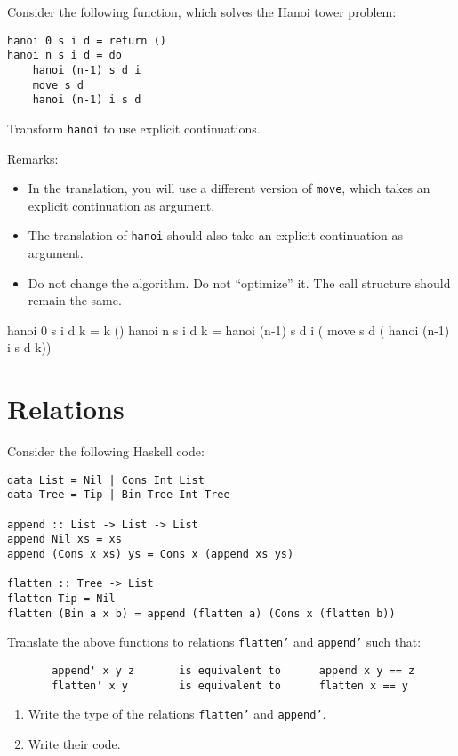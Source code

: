\documentclass{article}
\newcommand{\answer}[1]{}
\begin{document}
{Consider the following function, which solves the Hanoi tower problem:
\begin{verbatim}
hanoi 0 s i d = return ()
hanoi n s i d = do
    hanoi (n-1) s d i
    move s d 
    hanoi (n-1) i s d 
\end{verbatim}

Transform \texttt{hanoi} to use explicit continuations. 

Remarks: 
\begin{itemize}
\item In the translation, you will use a different version of
  \texttt{move}, which takes an explicit continuation as argument.
\item The translation of \texttt{hanoi} should also take an explicit
  continuation as argument.
\item Do not change the algorithm. Do not ``optimize'' it. The call
  structure should remain the same.
\end{itemize}

\answer{}{
hanoi 0 s i d k = k ()
hanoi n s i d k = 
    hanoi (n-1) s d i (
    move s d          (
    hanoi (n-1) i s d 
    k))
}

\section{Relations}

Consider the following Haskell code:

\begin{verbatim}
data List = Nil | Cons Int List
data Tree = Tip | Bin Tree Int Tree

append :: List -> List -> List
append Nil xs = xs
append (Cons x xs) ys = Cons x (append xs ys)

flatten :: Tree -> List
flatten Tip = Nil
flatten (Bin a x b) = append (flatten a) (Cons x (flatten b))
\end{verbatim}

Translate the above functions to relations \texttt{flatten'} and
\texttt{append'} such that:
\begin{verbatim}
       append' x y z       is equivalent to      append x y == z
       flatten' x y        is equivalent to      flatten x == y
\end{verbatim}

\begin{enumerate}
\item Write the type of the relations \texttt{flatten'} and
  \texttt{append'}. 
\item Write their code. 
\end{enumerate}

}
\end{document}
